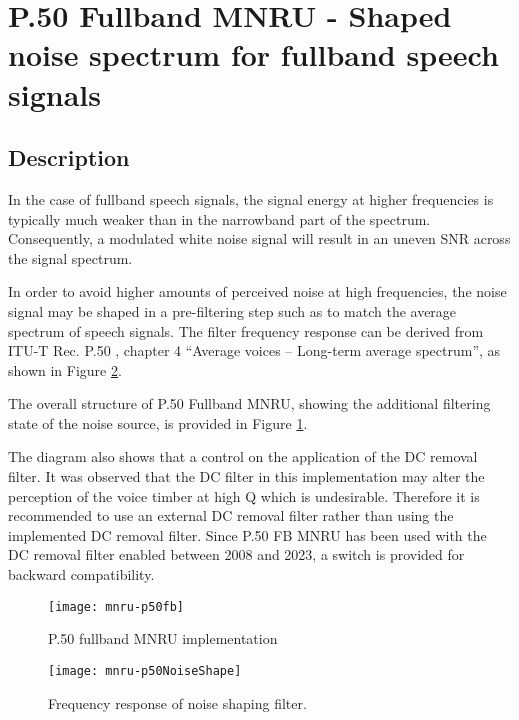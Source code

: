 \section{P.50 Fullband MNRU - Shaped noise spectrum for fullband speech signals} \label{fullband}

\subsection {Description}

In the case of fullband speech signals, the signal energy at higher frequencies is typically much weaker than in the
narrowband part of the spectrum.
Consequently, a modulated white noise signal will result in an uneven SNR across the signal spectrum.

In order to avoid higher amounts of perceived noise at high frequencies, the noise signal may be shaped in a pre-filtering
step such as to match the average spectrum of speech signals.
The filter frequency response can be derived from ITU-T Rec. P.50 \cite{P.50}, chapter 4 “Average voices – Long-term
average spectrum”, as shown in Figure \ref{MNRUP50}.

The overall structure of P.50 Fullband MNRU, showing the additional filtering state of the noise source, is provided in
Figure \ref{MNRUP50FB}.

The diagram also shows that a control on the application of the DC removal filter.
It was observed that the DC filter in this implementation may alter the perception of the voice timber at high Q which
is undesirable.
Therefore it is recommended to use an external DC removal filter rather than using the implemented DC removal filter.
Since P.50 FB MNRU has been used with the DC removal filter enabled between 2008 and 2023, a switch is provided for
backward compatibility.

\begin{figure}[ht]
    \begin{center}
        \texttt{[image: mnru-p50fb]}
    \end{center}
    \caption{P.50 fullband MNRU implementation\label{MNRUP50FB}}
\end{figure}

\begin{figure}[ht]
    \begin{center}
        \texttt{[image: mnru-p50NoiseShape]}
    \end{center}
    \caption{Frequency response of noise shaping filter.\label{MNRUP50}}
\end{figure}


